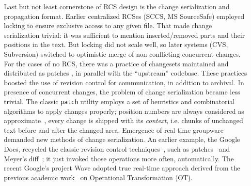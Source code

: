 \documentclass{acm_proc_article-sp}
\begin{document}
Last but not least cornerstone of RCS design is the change serialization and propagation format.
Earlier centralized RCSes (SCCS, MS SourceSafe) employed locking to ensure exclusive access to any given file.
That made change serialization trivial: it was sufficient to mention inserted/removed parts and their positions in the text.
But locking did not scale well, so later systems (CVS, Subversion) switched to optimistic merge of non-conflicting concurrent changes.
For the cases of no RCS, there was a practice of changesets maintained and distributed as patches \cite{stdpatch}, in parallel with the ``upstream'' codebase.
These practices boosted the use of revision control for communication, in addition to archival. 
In presence of concurrent changes, the problem of change serialization became less trivial.
The classic \verb+patch+ utility employs a set of heuristics and combinatorial algorithms to apply changes properly; position numbers are always considered as approximate~\cite{patch,fraser}, every change is shipped with its \emph{context}, i.e. chunks of unchanged text before and after the changed area.
Emergence of real-time groupware demanded new methods of change serialization.
An earlier example, the Google Docs, recycled the classic revision control techniques~\cite{diff-match-patch}, such as patches~\cite{patch} and Meyer's diff~\cite{meyers-diff}; it just invoked those operations more often, automatically.
The recent Google's project Wave adopted true real-time approach derived from the previous academic work~\cite{jupiter} on Operational Transformation (OT).
\end{document}

